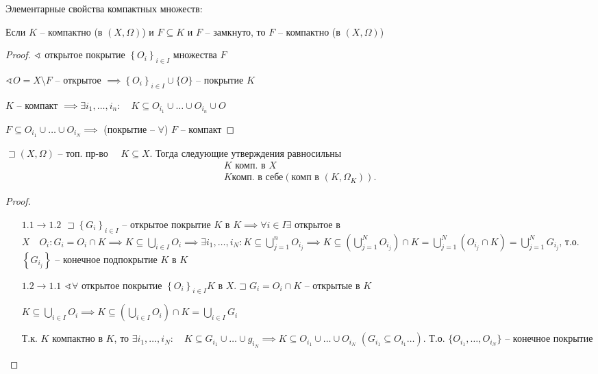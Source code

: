 \documentclass{book}
\theoremstyle{definition}
\begin{document}
Элементарные свойства компактных множеств:
\begin{statement}\label{st1}
    Если $K$ -- компактно (в  $(X, \Omega)$) и  $F\subseteq K$ и $F$ -- замкнуто, то  $F$ -- компактно (в  $(X, \Omega)$)
\end{statement}
\begin{proof}
    $\sphericalangle $ открытое покрытие  $\left\{ O_i \right\} _{i\in I}$ множества $F$

    $\sphericalangle O = X\setminus F$ -- открытое $ \implies  \left\{ O_i \right\} _{i\in I} \cup \{O\}$ -- покрытие $ K$

    $K$ -- компакт  $\implies \exists i_1, \ldots, i_n:\quad K\subseteq O_{i_1} \cup \ldots\cup O_{i_n} \cup O$

    $F\subseteq O_{i_1} \cup  \ldots\cup O_{i_N} \implies $ (покрытие -- $\forall $) $F$ -- компакт
\end{proof}
\begin{statement}
    $\sqsupset (X, \Omega)$ -- топ. пр-во $\quad K\subseteq X$. Тогда следующие утверждения равносильны
    \begin{align}
        K \text{ комп. в } X\\
        K  \text{комп. в себе} \left( \text{комп в } (K, \Omega_K) \right) 
    .\end{align}
\end{statement}
\begin{proof}
     \begin{itemize}
         \item []
         \item [$1.1 \to 1.2$] $\sqsupset \left\{ G_i \right\} _{i\in I}$ -- открытое покрытие $K$  в  $K \implies  \forall i\in I \exists $ открытое в $X\quad O_i: G_i = O_i \cap K \implies  K \subseteq \bigcup\limits_{i \in  I} O_i \implies \exists i_1, \ldots, i_N: K\subseteq \bigcup\limits_{j=1}^n O_{i_j} \implies K\subseteq \left( \bigcup\limits_{j=1}^N O_{i_j}  \right)\cap K = \bigcup\limits_{j=1}^N\left( O_{i_j}\cap K \right) = \bigcup\limits_{j=1}^N G_{i_j}    $, т.о. $\left\{ G_{i_j} \right\} $ -- конечное подпокрытие $K$ в  $ K$
         \item [$1.2\to 1.1$] $\sphericalangle \forall $ открытое покрытие $\left\{ O_i \right\} _{i\in I} K$ в $X. \sqsupset G_i = O_i\cap K$ -- открытые в $K$

             $K\subseteq \bigcup\limits_{i \in  I} O_i \implies K\subseteq \left( \bigcup\limits_{i \in  I} O_i \right) \cap K = \bigcup\limits_{i \in  I} G_i$

             Т.к. $K$ компактно в  $K$, то  $\exists  i_1, \ldots, i_N:\quad K\subseteq G_{i_1}\cup \ldots \cup g_{i_N} \implies K\subseteq O_{i_1}\cup \ldots \cup O_{i_N}$ $\left( G_{i_1}\subseteq O_{i_1} \ldots \right) $. Т.о. $\{O_{i_1}, \ldots, O_{i_N}\}$ -- конечное покрытие
    \end{itemize}
\end{proof}
\end{document}
